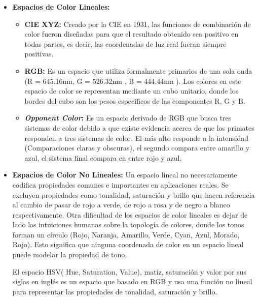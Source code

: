 \begin{itemize}
    \item \textbf{Espacios de Color Lineales:}
        \begin{itemize}
            \item \textbf{CIE XYZ:} Creado por la CIE en 1931, las funciones de combinación de color fueron diseñadas para que el resultado obtenido sea positivo en todas partes, es decir, las coordenadas de luz real fueran siempre positivas.
            \item \textbf{RGB:} Es un espacio que utiliza formalmente primarios de una sola onda (R = 645.16nm, G = 526.32nm , B = 444.44nm ). Los colores en este espacio de color se representan mediante un cubo unitario, donde los bordes del cubo son los pesos específicos de las componentes R, G y B.
            \item \textbf{\textit{Opponent Color}:} Es un espacio derivado de RGB que busca tres sistemas de color debido a que existe evidencia acerca de que los primates responden a tres sistemas de color. El más alto responde a la intensidad (Comparaciones claras y obscuras), el segundo compara entre amarillo y azul, el sistema final compara en entre rojo y azul.
\end{itemize}
    \item \textbf{Espacios de Color No Lineales:}
    Un espacio lineal no necesariamente codifica propiedades comunes e importantes en aplicaciones reales. Se excluyen propiedades como tonalidad, saturación y brillo que hacen referencia al cambio de pasar de rojo a verde, de rojo a rosa y de negro a blanco respectivamente. Otra dificultad de los espacios de color lineales es dejar de lado las intuiciones humanas sobre la topología de colores, donde los tonos forman un círculo (Rojo, Naranja, Amarillo, Verde, Cyan, Azul, Morado, Rojo). Esto significa que ninguna coordenada de color en un espacio lineal puede modelar la propiedad de tono\cite{forsyth2011computer}. 

    El espacio HSV( Hue, Saturation, Value), matíz, saturación y valor por sus siglas en inglés es un espacio que basado en RGB y usa una función no lineal para representar las propiedades de tonalidad, saturación y brillo.
\end{itemize}


